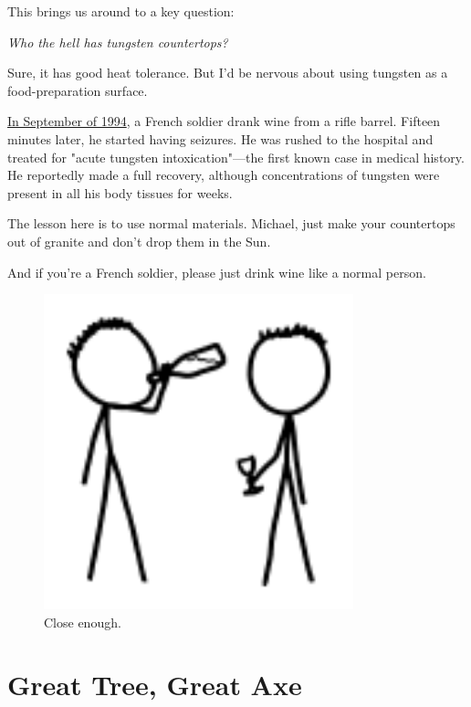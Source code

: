 {{This brings us around to a key question:}

{ \emph{Who the hell has tungsten countertops?} }

{Sure, it has good heat tolerance. But I'd be nervous about using tungsten as a food-preparation surface.}

{ \href{http://www.ncbi.nlm.nih.gov/pubmed/8874460}{In September of 1994}, a French soldier drank wine from a rifle barrel. Fifteen minutes later, he started having seizures. He was rushed to the hospital and treated for "acute tungsten intoxication"—the first known case in medical history. He reportedly made a full recovery, although concentrations of tungsten were present in all his body tissues for weeks.}

{The lesson here is to use normal materials. Michael, just make your countertops out of granite and don't drop them in the Sun.}

{And if you're a French soldier, please just drink wine like a normal person.}

\begin{figure}[!htbp]
\centering
\includegraphics[scale=0.5, max width=0.8\textwidth]{imgs/a/89/sun_wine.png}
\caption{Close enough.}
\end{figure}

{
\chapter{Great Tree, Great Axe}
}

}
